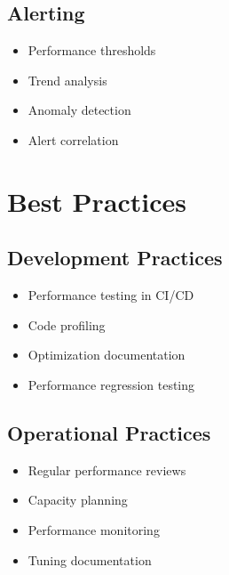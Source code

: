 \documentclass{article}
\begin{document}
\subsection{Alerting}
\begin{itemize}
    \item Performance thresholds
    \item Trend analysis
    \item Anomaly detection
    \item Alert correlation
\end{itemize}

\section{Best Practices}

\subsection{Development Practices}
\begin{itemize}
    \item Performance testing in CI/CD
    \item Code profiling
    \item Optimization documentation
    \item Performance regression testing
\end{itemize}

\subsection{Operational Practices}
\begin{itemize}
    \item Regular performance reviews
    \item Capacity planning
    \item Performance monitoring
    \item Tuning documentation
\end{itemize}
\end{document}
